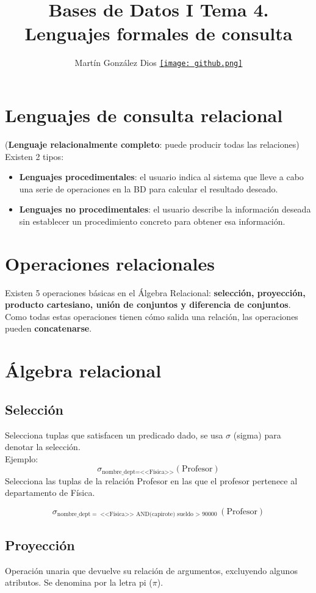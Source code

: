 \documentclass{article}
\title{Bases de Datos I Tema 4. Lenguajes formales de consulta}
\author{Martín González Dios 
\href{https://github.com/martindios}{\texttt{[image: github.png]}}}
\begin{document}
\maketitle

\section{Lenguajes de consulta relacional}
(\textbf{Lenguaje relacionalmente completo}: puede producir todas las relaciones)
Existen 2 tipos:
\begin{itemize}
    \item \textbf{Lenguajes procedimentales}: el usuario indica al sistema que lleve a cabo una serie de operaciones en la BD para calcular el resultado deseado.

    \item \textbf{Lenguajes no procedimentales}: el usuario describe la información deseada sin establecer un procedimiento concreto para obtener esa información. 
\end{itemize}

\section{Operaciones relacionales}
Existen 5 operaciones básicas en el Álgebra Relacional: \textbf{selección, proyección, producto cartesiano, unión de conjuntos y diferencia de conjuntos}. \\
Como todas estas operaciones tienen cómo salida una relación, las operaciones pueden \textbf{concatenarse}.

\section{Álgebra relacional}
\subsection{Selección}
Selecciona tuplas que satisfacen un predicado dado, se usa $\sigma$ (sigma) para denotar la selección. \\
Ejemplo: 
$$\sigma_{\text{nombre\_dept} = \text{<<Física>>}}(\text{Profesor})$$
Selecciona las tuplas de la relación Profesor en las que el profesor pertenece al departamento de Física. 

$$\sigma_{\text{nombre\_dept} = \text{<<Física>> AND(capirote) sueldo $>$ 90000}}(\text{Profesor})$$

\subsection{Proyección}
Operación unaria que devuelve su relación de argumentos, excluyendo algunos atributos. Se denomina por la letra pi ($\pi$). 
\end{document}
